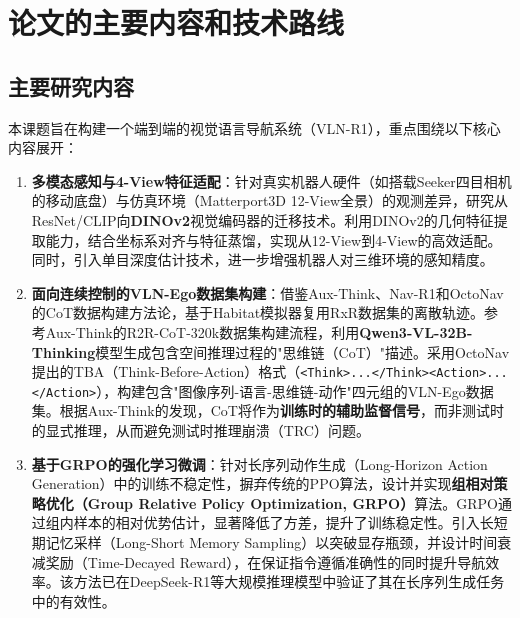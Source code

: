 \section{论文的主要内容和技术路线}

\subsection{主要研究内容}
本课题旨在构建一个端到端的视觉语言导航系统（VLN-R1），重点围绕以下核心内容展开：
\begin{enumerate}
    \item \textbf{多模态感知与4-View特征适配}：针对真实机器人硬件（如搭载Seeker四目相机的移动底盘）与仿真环境（Matterport3D 12-View全景）的观测差异，研究从ResNet/CLIP\cite{radford2021learning}向\textbf{DINOv2}\cite{dinov2}视觉编码器的迁移技术。利用DINOv2的几何特征提取能力，结合坐标系对齐与特征蒸馏，实现从12-View到4-View的高效适配。同时，引入单目深度估计技术，进一步增强机器人对三维环境的感知精度。
    \item \textbf{面向连续控制的VLN-Ego数据集构建}：借鉴Aux-Think\cite{aux_think}、Nav-R1\cite{nav_r1}和OctoNav\cite{octonav}的CoT数据构建方法论，基于Habitat模拟器\cite{savva2019habitat}复用RxR\cite{ku2020rxr}数据集的离散轨迹。参考Aux-Think的R2R-CoT-320k数据集构建流程，利用\textbf{Qwen3-VL-32B-Thinking}模型生成包含空间推理过程的"思维链（CoT）"描述。采用OctoNav提出的TBA（Think-Before-Action）格式（\texttt{<Think>...</Think>}\texttt{<Action>...</Action>}），构建包含"图像序列-语言-思维链-动作"四元组的VLN-Ego数据集。根据Aux-Think的发现，CoT将作为\textbf{训练时的辅助监督信号}，而非测试时的显式推理，从而避免测试时推理崩溃（TRC）问题。
    \item \textbf{基于GRPO的强化学习微调}：针对长序列动作生成（Long-Horizon Action Generation）中的训练不稳定性，摒弃传统的PPO算法，设计并实现\textbf{组相对策略优化（Group Relative Policy Optimization, GRPO）}\cite{deepseek_r1}算法。GRPO通过组内样本的相对优势估计，显著降低了方差，提升了训练稳定性。引入长短期记忆采样（Long-Short Memory Sampling）以突破显存瓶颈，并设计时间衰减奖励（Time-Decayed Reward），在保证指令遵循准确性的同时提升导航效率。该方法已在DeepSeek-R1\cite{deepseek_r1}等大规模推理模型中验证了其在长序列生成任务中的有效性。
\end{enumerate}

